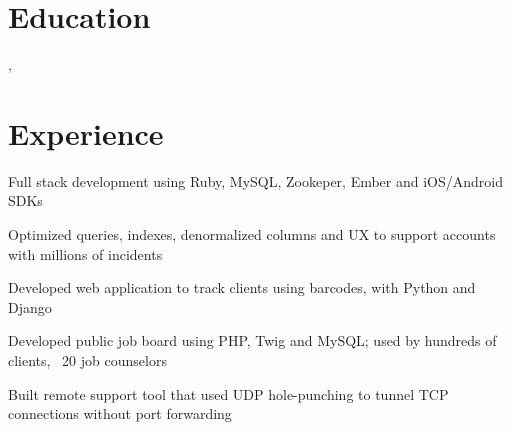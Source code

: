 \documentclass[12pt]{jmichaud-resume}
\begin{document}

\section{Education} 
,  \hfill {}

\section{Experience}
 \hfill {}
\begin{tightemize}
	\item Full stack development using Ruby, MySQL, Zookeper, Ember and iOS/Android SDKs
	\item Optimized queries, indexes, denormalized columns and UX to support accounts with millions of incidents
\end{tightemize}
\sectionsep

 \hfill {}
\begin{tightemize}
	\item Developed web application to track clients using barcodes, with Python and Django
\end{tightemize}
\sectionsep

 \hfill {}
\begin{tightemize}
	\item Developed public job board using PHP, Twig and MySQL; used by hundreds of clients, ~20 job counselors
	\item Built remote support tool that used UDP hole-punching to tunnel TCP connections without port forwarding
\end{tightemize}
\sectionsep

 \hfill {}
\end{document}
